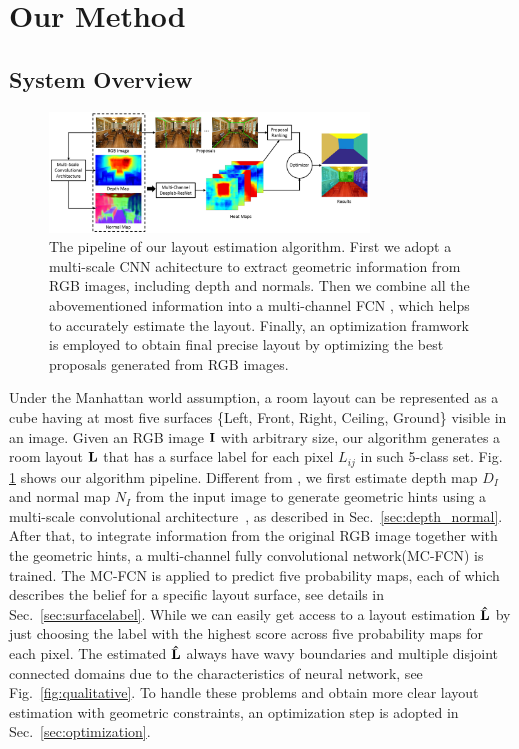 \section{Our Method}
\label{sec:Meth}


\subsection{System Overview}
\label{subsection:overview}

\begin{figure}[!ht]
	\centering
	\includegraphics[width=8.5cm]{figure/ppline.png}
	\caption{The pipeline of our layout estimation algorithm. First we adopt a multi-scale CNN achitecture \cite{eigen2015predicting} to extract geometric information from RGB images, including depth and normals. Then we combine all the abovementioned information into a multi-channel FCN , which helps to accurately estimate the layout. Finally, an optimization framwork is employed to obtain final precise layout by optimizing the best proposals generated from RGB images.}
	\label{fig:pipeline}
\end{figure}

Under the Manhattan world assumption, a room layout can be represented as a cube having at most five surfaces \{Left, Front, Right, Ceiling, Ground\} visible in an image. 
%
Given an RGB image $\mathbf{I}$ with arbitrary size, our algorithm generates a room layout $\mathbf{L}$ that has a surface label for each pixel $L_{ij} $ in such 5-class set. Fig. \ref{fig:pipeline} shows our algorithm pipeline. 
Different from \cite{dasgupta2016delay,ren2016coarse}, we first estimate depth map $D_{I}$ and normal map $N_{I}$ from the input image to generate geometric hints using a multi-scale convolutional architecture~\cite{eigen2015predicting}, as described in Sec.~\ref{sec:depth_normal}.
After that, to integrate information from the original RGB image together with the geometric hints, a multi-channel fully convolutional network(MC-FCN) is trained. The MC-FCN is applied to predict five probability maps, each of which describes the belief for a specific layout surface, see details in Sec.~\ref{sec:surfacelabel}.
While we can easily get access to a layout estimation $\mathbf{\hat{L}}$ by just choosing the label with the highest score across five probability maps for each pixel. 
The estimated $\mathbf{\hat{L}}$ always have wavy boundaries and multiple disjoint connected domains due to the characteristics of neural network, see Fig.~\ref{fig:qualitative}. To handle these problems and obtain more clear layout estimation with geometric constraints, an optimization step is adopted in Sec.~\ref{sec:optimization}.  
 

